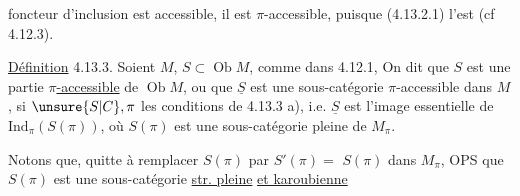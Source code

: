 foncteur d'inclusion est accessible,
 il est $\pi$-accessible, puisque
(4.13.2.1) l'est (cf 4.12.3).

\uline{Définition} 4.13.3. Soient $M$, $S\subset\operatorname{Ob}M$,  comme
dans 4.12.1,  On dit que $S$ est
une partie \uline{$\pi$-accessible} de $\operatorname{Ob}M$,
ou que $\underline S$ est une sous-catégorie
$\pi$-accessible dans $M$, si 
  $\unsure{S|C},\pi$  les
conditions de 4.13.3 a), i.e.
$\underline S$ est l'image essentielle de $\mathrm{Ind}_\pi(S(\pi))$,
où $S(\pi)$ est une sous-catégorie pleine
de $M_\pi$.

Notons que, quitte à remplacer
$S(\pi)$ par $S'(\pi)=$  $S(\pi)$
dans $M_\pi$, OPS que $S(\pi)$ est une
sous-catégorie \uline{str. pleine} \uline{et karoubienne}
